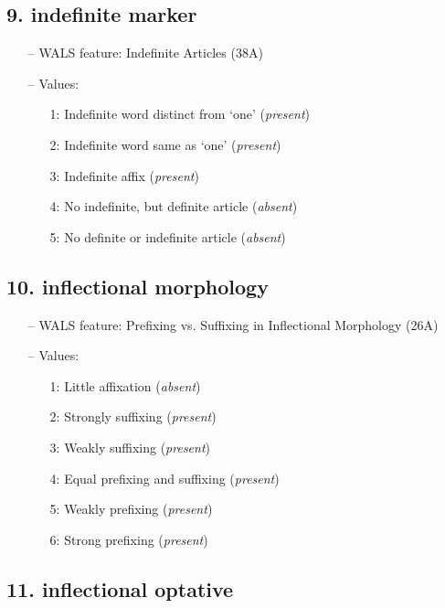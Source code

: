 \subsection*{9. indefinite marker}

\begin{itemize}
  \item[--] WALS feature: Indefinite Articles (38A)
  \item[--] Values:
  {\small
  \begin{enumerate}
    \item[1:] Indefinite word distinct from `one' (\emph{present})
    \item[2:] Indefinite word same as `one' (\emph{present})
    \item[3:] Indefinite affix (\emph{present})
    \item[4:] No indefinite, but definite article (\emph{absent})
    \item[5:] No definite or indefinite article (\emph{absent})
  \end{enumerate}
  }
\end{itemize}


\subsection*{10. inflectional morphology}

\begin{itemize}
  \item[--] WALS feature: Prefixing vs. Suffixing in Inflectional Morphology (26A)
  \item[--] Values:
  {\small
  \begin{enumerate}
    \item[1:] Little affixation (\emph{absent})
    \item[2:] Strongly suffixing (\emph{present})
    \item[3:] Weakly suffixing (\emph{present})
    \item[4:] Equal prefixing and suffixing (\emph{present})
    \item[5:] Weakly prefixing (\emph{present})
    \item[6:] Strong prefixing (\emph{present})
  \end{enumerate}
  }
\end{itemize}


\subsection*{11. inflectional optative}


